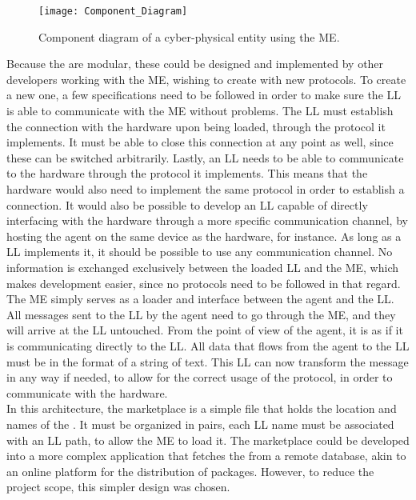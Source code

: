 \begin{figure}[h!]
	\centering
	\texttt{[image: Component\_Diagram]}
	\caption{Component diagram of a cyber-physical entity using the \acrlong{ME}.}
	\label{fig:component_diagram}
\end{figure}

Because the  are modular, these could be designed and implemented by other developers working with the \acrlong{ME}, wishing to create  with new protocols. To create a new one, a few specifications need to be followed in order to make sure the \acrshort{LL} is able to communicate with the \acrshort{ME} without problems. The \acrshort{LL} must establish the connection with the hardware upon being loaded, through the protocol it implements. It must be able to close this connection at any point as well, since these  can be switched arbitrarily. Lastly, an \acrshort{LL} needs to be able to communicate to the hardware through the protocol it implements. This means that the hardware would also need to implement the same protocol in order to establish a connection. It would also be possible to develop an \acrshort{LL} capable of directly interfacing with the hardware through a more specific communication channel, by hosting the agent on the same device as the hardware, for instance. As long as a \acrlong{LL} implements it, it should be possible to use any communication channel. No information is exchanged exclusively between the loaded \acrlong{LL} and the \acrlong{ME}, which makes development easier, since no protocols need to be followed in that regard.\\ 

The \acrlong{ME} simply serves as a loader and interface between the agent and the \acrlong{LL}. All messages sent to the \acrshort{LL} by the agent need to go through the \acrshort{ME}, and they will arrive at the \acrshort{LL} untouched. From the point of view of the agent, it is as if it is communicating directly to the \acrshort{LL}. All data that flows from the agent to the \acrlong{LL} must be in the format of a string of text. This \acrshort{LL} can now transform the message in any way if needed, to allow for the correct usage of the protocol, in order to communicate with the hardware.\\

In this architecture, the marketplace is a simple file that holds the location and names of the . It must be organized in pairs, each \acrshort{LL} name must be associated with an \acrshort{LL} path, to allow the \acrshort{ME} to load it. The marketplace could be developed into a more complex application that fetches the  from a remote database, akin to an online platform for the distribution of packages. However, to reduce the project scope, this simpler design was chosen.

